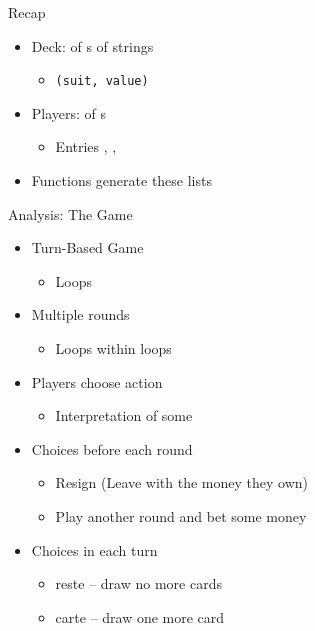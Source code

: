 
\begin{frame}[t,plain]
\titlepage
\end{frame}


\begin{frame}[fragile]{Recap}
%
\begin{itemize}
\item Deck:  of s of strings
	\begin{itemize}
	\item \texttt{(suit, value)}
	\end{itemize}
\item Players:  of s
	\begin{itemize}
	\item Entries , , 
	\end{itemize}
\item Functions generate these lists
\end{itemize}
%
\end{frame}


\begin{frame}[fragile]{Analysis: The Game}
%
\begin{itemize}
\item Turn-Based Game
	\begin{itemize}
	\item Loops
	\end{itemize}
\item Multiple rounds
	\begin{itemize}
	\item Loops within loops
	\end{itemize}
\item Players choose action
	\begin{itemize}
	\item Interpretation of some 
	\end{itemize}
\item Choices before each round
	\begin{itemize}
	\item Resign (Leave with the money they own)
	\item Play another round and bet some money
	\end{itemize}
\item Choices in each turn
	\begin{itemize}
	\item reste -- draw no more cards
	\item carte -- draw one more card
	\end{itemize}
\end{itemize}
%
\end{frame}

